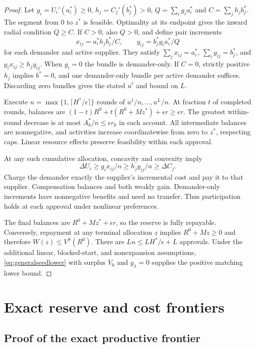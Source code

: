 \documentclass[ecta,draft,supplement]{econsocart}
\theoremstyle{definition}
\theoremstyle{definition}
\begin{document}
\begin{appendix}
\begin{proof}
Let $g_i=U_i'(a_i^*)\geq0$, $h_j=C_j'(b_j^*)>0$,
$Q=\sum_i g_ia_i^*$ and $C=\sum_jh_jb_j^*$.
The segment from $0$ to $z^*$ is feasible. Optimality at its
endpoint gives the inward radial condition $Q\geq C$.
If $C>0$, also $Q>0$, and define pair increments
\[
 x_{ij}=a_i^*h_jb_j^*/C,\qquad
 y_{ij}=b_j^*g_ia_i^*/Q
\]
for each demander and active supplier. They satisfy
$\sum_jx_{ij}=a_i^*$, $\sum_i y_{ij}=b_j^*$, and
$g_ix_{ij}\geq h_jy_{ij}$. When $g_i=0$ the bundle is
demander-only. If $C=0$, strictly positive $h_j$ implies
$b^*=0$, and one demander-only bundle per active demander suffices.
Discarding zero bundles gives the stated $u^\ell$ and bound on $L$.

Execute $n=\max\{1,\lceil H^*/\epsilon\rceil\}$ rounds
of $u^1/n,\ldots,u^L/n$. At fraction $t$ of completed rounds,
balances are $(1-t)R^0+t(R^0+Mz^*)+\epsilon r\geq\epsilon r$.
The greatest within-round decrease is at most
$A_k^*/n\leq\epsilon r_k$ in each account. All intermediate
balances are nonnegative, and activities increase coordinatewise
from zero to $z^*$, respecting caps. Linear resource effects
preserve feasibility within each approval.

At any such cumulative allocation, concavity and convexity imply
\[
 \Delta U_i\geq g_ix_{ij}/n
             \geq h_jy_{ij}/n\geq\Delta C_j.
\]
Charge the demander exactly the supplier's incremental cost and
pay it to that supplier. Compensation balances and both weakly gain.
Demander-only increments have nonnegative benefits and need no
transfer. Thus participation holds at each approval under nonlinear
preferences.

The final balances are $R^0+Mz^*+\epsilon r$, so the reserve
is fully repayable. Conversely, repayment at any terminal allocation
$z$ implies $R^0+Mz\geq0$ and therefore $W(z)\leq V^S(R^0)$.
There are $Ln\leq LH^*/\epsilon+L$ approvals. Under the additional
linear, blocked-start, and nonexpansion assumptions,
\eqref{eq:generalseedlower} with surplus $V_0$ and
$g_\lambda=0$ supplies the positive matching lower bound.
\end{proof}

\section{Exact reserve and cost frontiers}\label{app:localrobustness}
\subsection{Proof of the exact productive frontier}


\end{appendix}
\end{document}
